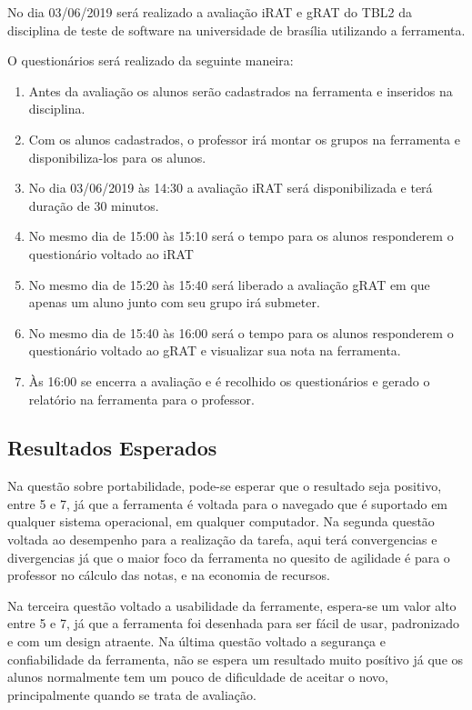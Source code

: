 No dia 03/06/2019 será realizado a avaliação iRAT e gRAT do TBL2 da disciplina de teste de software na universidade de brasília utilizando a ferramenta.

O questionários será realizado da seguinte maneira:

\begin{enumerate}
  \item Antes da avaliação os alunos serão cadastrados na ferramenta e inseridos na disciplina.
  \item Com os alunos cadastrados, o professor irá montar os grupos na ferramenta e disponibiliza-los para os alunos.
  \item No dia 03/06/2019 às 14:30 a avaliação iRAT será disponibilizada e terá duração de 30 minutos.
  \item No mesmo dia de 15:00 às 15:10 será o tempo para os alunos responderem o questionário voltado ao iRAT
  \item No mesmo dia de 15:20 às 15:40 será liberado a avaliação gRAT em que apenas um aluno junto com seu grupo irá submeter.
  \item No mesmo dia de 15:40 às 16:00 será o tempo para os alunos responderem o questionário voltado ao gRAT e visualizar sua nota na ferramenta.
  \item Às 16:00 se encerra a avaliação e é recolhido os questionários e gerado o relatório na ferramenta para o professor.
\end{enumerate}

\subsection{Resultados Esperados}

Na questão sobre portabilidade, pode-se esperar que o resultado seja positivo, entre 5 e 7, já que a ferramenta é voltada para o
navegado que é suportado em qualquer sistema operacional, em qualquer computador. Na segunda questão voltada ao
desempenho para a realização da tarefa, aqui terá convergencias e divergencias já que o maior foco da ferramenta no
quesito de agilidade é para o professor no cálculo das notas, e na economia de recursos.

Na terceira questão voltado a usabilidade da ferramente, espera-se um valor alto entre 5 e 7, já que a ferramenta foi
desenhada para ser fácil de usar, padronizado e com um design atraente. Na última questão voltado a segurança e
confiabilidade da ferramenta, não se espera um resultado muito posítivo já que os alunos normalmente tem um pouco de
dificuldade de aceitar o novo, principalmente quando se trata de avaliação.

